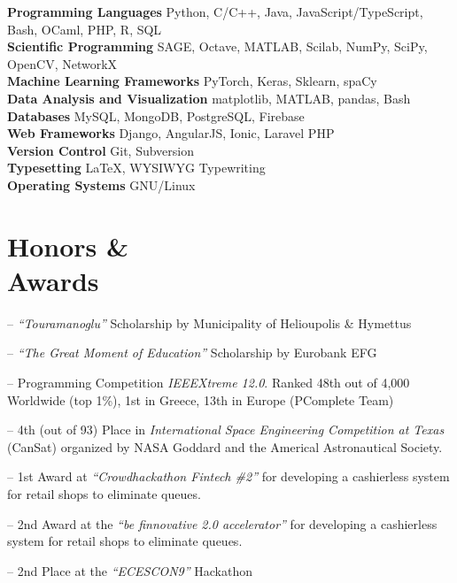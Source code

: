 \documentclass[margin]{res}
\newcommand{\field}[2]{\noindent \textbf{#1} \hfill #2 \\}
\begin{document}
\begin{resume}
\field{Programming Languages}  {Python, C/C++, Java, JavaScript/TypeScript, Bash, OCaml, PHP, R, SQL  } 
\field{Scientific Programming} {SAGE, Octave, MATLAB, Scilab, NumPy, SciPy, OpenCV, NetworkX } 
\field{Machine Learning Frameworks}  {PyTorch, Keras, Sklearn, spaCy } 
\field{Data Analysis and Visualization} {matplotlib, MATLAB, pandas, Bash } 
\field{Databases} {MySQL, MongoDB, PostgreSQL, Firebase}
\field{Web Frameworks} {Django, AngularJS, Ionic, Laravel PHP}
\field{Version Control} {Git, Subversion}
\field{Typesetting} {\LaTeX, WYSIWYG Typewriting}
\field{Operating Systems} {GNU/Linux}
\section{Honors \& \\ Awards} 
\begin{compactitem}
    \item [--] \emph{``Touramanoglu''} Scholarship by Municipality of Helioupolis \& Hymettus
    \item [--] \emph{``The Great Moment of Education''} Scholarship by Eurobank EFG 
\end{compactitem} 
\begin{compactitem}
    \item[--] Programming Competition \emph{IEEEXtreme 12.0}. Ranked 48th out of 4,000 Worldwide (top 1\%), 1st in Greece, 13th in Europe (PComplete Team)
    \item[--] 4th (out of 93) Place in \emph{International Space Engineering  Competition at Texas} (CanSat) organized by NASA Goddard and the Americal Astronautical Society.
    \item[--] 1st Award at \emph{``Crowdhackathon Fintech \#2''} for developing a cashierless system for retail shops to eliminate queues.
    \item[--] 2nd Award at the \emph{``be finnovative 2.0 accelerator''} for developing a cashierless system for retail shops to eliminate queues.
    \item[--] 2nd Place at the \emph{``ECESCON9''} Hackathon 
\end{compactitem}




\end{resume}
\end{document}
